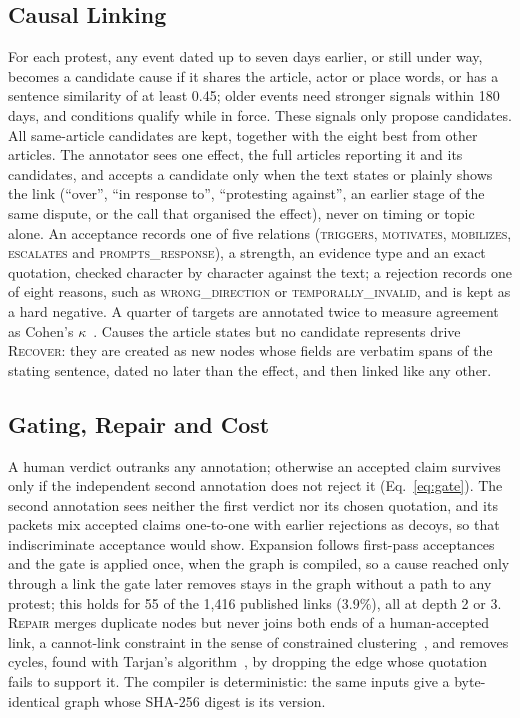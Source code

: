 \documentclass[conference]{IEEEtran}
\begin{document}
\subsection{Causal Linking}
\label{sec:judge}
For each protest, any event dated up to seven days earlier, or still under way, becomes a candidate
cause if it shares the article, actor or place words, or has a sentence similarity of at least 0.45;
older events need stronger signals within 180 days, and conditions qualify while in force. These
signals only propose candidates. All same-article candidates are kept, together with the eight best
from other articles. The annotator sees one effect, the full articles reporting it and its
candidates, and accepts a candidate only when the text states or plainly shows the link
(``over'', ``in response to'', ``protesting against'', an earlier stage of the same dispute, or the
call that organised the effect), never on timing or topic alone. An acceptance records one of five
relations (\textsc{triggers}, \textsc{motivates}, \textsc{mobilizes}, \textsc{escalates} and
\textsc{prompts\_response}), a strength, an evidence type and an exact quotation, checked character
by character against the text; a rejection records one of eight reasons, such as
\textsc{wrong\_direction} or \textsc{temporally\_invalid}, and is kept as a hard negative. A quarter
of targets are annotated twice to measure agreement as Cohen's $\kappa$~\cite{cohen}. Causes the
article states but no candidate represents drive \textsc{Recover}: they are created as new nodes
whose fields are verbatim spans of the stating sentence, dated no later than the effect, and then
linked like any other.

\subsection{Gating, Repair and Cost}
A human verdict outranks any annotation; otherwise an accepted claim survives only if the
independent second annotation does not reject it (Eq.~\ref{eq:gate}). The second annotation sees
neither the first verdict nor its chosen quotation, and its packets mix accepted claims one-to-one
with earlier rejections as decoys, so that indiscriminate acceptance would show. Expansion follows
first-pass acceptances and the gate is applied once, when the graph is compiled, so a cause reached
only through a link the gate later removes stays in the graph without a path to any protest; this
holds for 55 of the 1{,}416 published links (3.9\%), all at depth 2 or 3. \textsc{Repair}
merges duplicate nodes but never joins both ends of a human-accepted link, a cannot-link constraint
in the sense of constrained clustering~\cite{wagstaff}, and removes cycles, found with Tarjan's
algorithm~\cite{tarjan}, by dropping the edge whose quotation fails to support it. The compiler is
deterministic: the same inputs give a byte-identical graph whose SHA-256 digest is its version.
\end{document}
